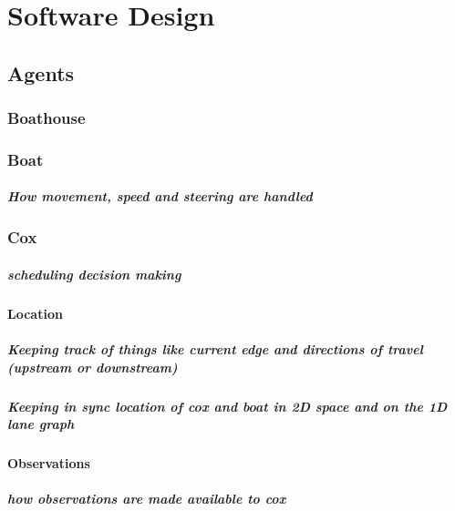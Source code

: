 \chapter{Software Design}\label{chapter:softwaredesign}

\section{Agents}
  \subsection{Boathouse}
  
  \subsection{Boat}
    \paragraph{How movement, speed and steering are handled}
    
  \subsection{Cox}
    \paragraph{scheduling decision making}
    \subsubsection{Location}
      \paragraph{Keeping track of things like current edge and directions of travel (upstream or downstream)}
      \paragraph{Keeping in sync location of cox and boat in 2D space and on the 1D lane graph}
    \subsubsection{Observations}
      \paragraph{how observations are made available to cox}
    
